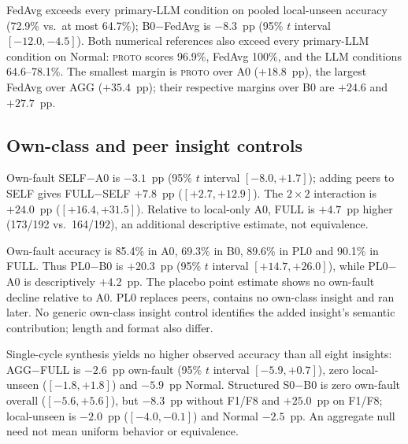 \documentclass[conference]{IEEEtran}
\newcommand{\PROTO}{\textsc{proto}}
\newcommand{\cond}[1]{\textsf{#1}}
\begin{document}
FedAvg exceeds every primary-LLM condition on pooled local-unseen accuracy (72.9\% vs.\ at most 64.7\%); \cond{B0}$-$FedAvg is $-8.3$~pp (95\% $t$ interval $[-12.0, -4.5]$). Both numerical references also exceed every primary-LLM condition on Normal: \PROTO{} scores 96.9\%, FedAvg 100\%, and the LLM conditions 64.6--78.1\%. The smallest margin is \PROTO{} over \cond{A0} ($+18.8$~pp), the largest FedAvg over \cond{AGG} ($+35.4$~pp); their respective margins over \cond{B0} are $+24.6$ and $+27.7$~pp.

\begin{table}[t]
\centering\footnotesize
\caption{LLM descriptive fault-partition contrasts (pp), weighting included faults equally: 192, 144 and 48 physical runs. No additional hypothesis tests.}
\label{tab:partitions}
\setlength{\tabcolsep}{3pt}

\end{table}

\subsection{Own-class and peer insight controls}
Own-fault \cond{SELF}$-$\cond{A0} is $-3.1$~pp (95\% $t$ interval $[-8.0, +1.7]$); adding peers to \cond{SELF} gives \cond{FULL}$-$\cond{SELF} $+7.8$~pp ($[+2.7, +12.9]$). The $2\times2$ interaction is $+24.0$~pp ($[+16.4, +31.5]$). Relative to local-only \cond{A0}, \cond{FULL} is $+4.7$~pp higher (173/192 vs.\ 164/192), an additional descriptive estimate, not equivalence.

Own-fault accuracy is 85.4\% in \cond{A0}, 69.3\% in \cond{B0}, 89.6\% in \cond{PL0} and 90.1\% in \cond{FULL}. Thus \cond{PL0}$-$\cond{B0} is $+20.3$~pp (95\% $t$ interval $[+14.7, +26.0]$), while \cond{PL0}$-$\cond{A0} is descriptively $+4.2$~pp. The placebo point estimate shows no own-fault decline relative to \cond{A0}. \cond{PL0} replaces peers, contains no own-class insight and ran later. No generic own-class insight control identifies the added insight's semantic contribution; length and format also differ.

Single-cycle synthesis yields no higher observed accuracy than all eight insights: \cond{AGG}$-$\cond{FULL} is $-2.6$~pp own-fault (95\% $t$ interval $[-5.9, +0.7]$), zero local-unseen ($[-1.8, +1.8]$) and $-5.9$~pp Normal. Structured \cond{S0}$-$\cond{B0} is zero own-fault overall ($[-5.6, +5.6]$), but $-8.3$~pp without F1/F8 and $+25.0$~pp on F1/F8; local-unseen is $-2.0$~pp ($[-4.0, -0.1]$) and Normal $-2.5$~pp. An aggregate null need not mean uniform behavior or equivalence.
\end{document}
